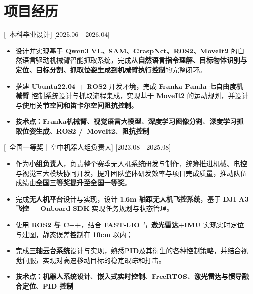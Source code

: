 \documentclass{resume}
\begin{document}
\section{\textcolor{myblue}{项目经历}}

[\textcolor{deepred}{\ 本科毕业设计}]
[2025.06—2026.04]

\begin{itemize}
  \item 设计并实现基于 \textbf{Qwen3-VL、SAM、GraspNet、ROS2、MoveIt2} 的自然语言驱动机械臂智能抓取系统，完成从\textbf{自然语言指令理解、目标物体识别与定位、目标分割、抓取位姿生成到机械臂执行控制}的完整闭环。
  \item 搭建 \textbf{Ubuntu22.04 + ROS2} 开发环境，完成 \textbf{Franka Panda 七自由度机械臂} 控制系统设计与抓取流程集成，实现基于 \textbf{MoveIt2} 的运动规划，并设计与使用\textbf{关节空间和笛卡尔空间阻抗控制}。
  \item \textbf{\textcolor{deepred}{技术点：}}\textbf{Franka机械臂}、\textbf{视觉语言大模型}、\textbf{深度学习图像分割}、\textbf{深度学习抓取位姿生成}、\textbf{ROS2 /\ MoveIt2}、\textbf{阻抗控制}\\
\end{itemize}

[\textcolor{deepred}{\ 全国一等奖｜空中机器人组负责人}]
[2023.08—2025.08]

\begin{itemize}
  \item 作为\textbf{小组负责人}，负责整个赛季无人机系统研发与制作，统筹推进机械、电控与视觉三大模块协同开发，提升团队整体研发效率与项目完成质量，推动队伍成绩由\textbf{全国三等奖提升至全国一等奖}。
  \item 完成\textbf{无人机平台}设计与实现，设计 \textbf{1.6m 轴距无人机飞控系统}，基于 \textbf{DJI A3 飞控 + Onboard SDK} 实现任务规划与状态管理。
  \item 使用 \textbf{ROS2 与 C++}，结合 \textbf{FAST-LIO} 与 \textbf{激光雷达+IMU} 实现实时定位与建图，静态误差控制在 \textbf{10cm} 以内；
  \item 完成\textbf{三轴云台系统}设计与实现，熟悉\textbf{PID}及其衍生的各种控制策略，并结合视觉伺服，实现对高速移动目标的稳定跟踪和打击。
  \item \textbf{\textcolor{deepred}{技术点：}}\textbf{机器人系统设计}、\textbf{嵌入式实时控制}、\textbf{FreeRTOS}、\textbf{激光雷达与惯导融合定位}、\textbf{PID 控制}\\
\end{itemize}
\end{document}
